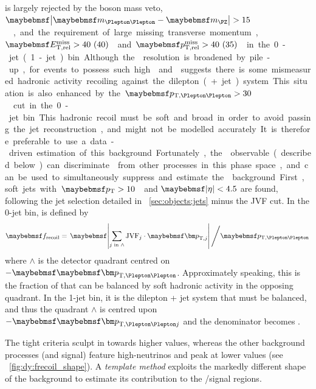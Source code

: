 \DYll is largely rejected by the \PZ boson mass veto, 
\unit{$\mods{\mll - \mZ} > 15$}{\GeV}, and the requirement of large missing transverse 
momentum, \unit{$\calometrel > 40~(40)$}{\GeV} and \unit{$\trackmetrel > 40~(35)$}{\GeV} in 
the 0-jet (1-jet) bin. Although the \met resolution is broadened by pile-up, for 
events to possess such high \calometrel and \trackmetrel suggests there is some mismeasured 
hadronic activity recoiling against the dilepton (+ jet) system. This situation is also 
enhanced by the \unit{$\ptll > 30$}{\GeV} cut in the 0-jet bin.

This hadronic recoil must be soft and broad in order to avoid passing the jet 
reconstruction, and might not be modelled accurately. It is therefore preferable to use 
a data-driven estimation of this background. Fortunately, the \frecoil observable 
(described below) can discriminate \DYll from other processes in this phase space, and 
can be used to simultaneously suppress and estimate the \DYll background.

First, soft jets with \unit{$\pt > 10$}{\GeV} and $\mods{\eta} < 4.5$ are found, 
following the jet selection detailed in \Section~\ref{sec:objects:jets} minus the JVF 
cut. In the 0-jet bin, \frecoil is defined by
\begin{equation}
	\frecoil = \left. \mods{\sum\limits_{j\text{ in }\wedge} \text{JVF}_{j} \cdot \bvec{p}_{\text{T,}j}} \, \middle/ \ptll \right.
	\label{eq:dy:frecoil}
\end{equation}
where $\wedge$ is the detector quadrant centred on $-\ptllvec$. Approximately speaking, 
this is the fraction of \ptll that can be balanced by soft hadronic activity in the 
opposing quadrant. In the 1-jet bin, it is the dilepton + jet system that must be balanced, 
and thus the quadrant $\wedge$ is centred upon $-\ptlljvec$ and the denominator becomes 
\ptllj.

The tight \met criteria sculpt \frecoil in \DYll towards higher values, whereas the other 
background processes (and signal) feature high-\pt neutrinos and peak at lower values 
(see \Figure~\ref{fig:dy:frecoil_shape}). A \textit{template method} exploits the 
markedly different \frecoil shape of the \DYll background to estimate its contribution to 
the \eech/\mmch signal regions.

